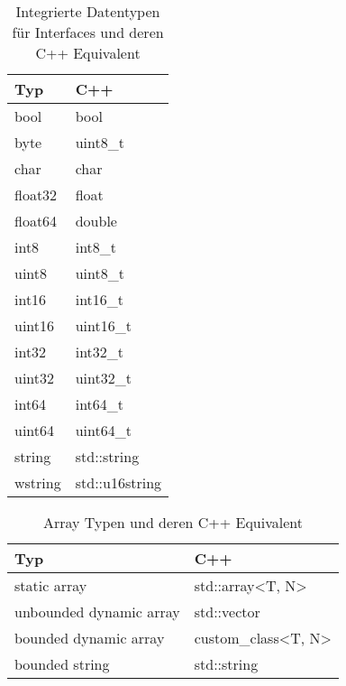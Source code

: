 \begin{table}[ht]
    \centering
    \caption{Integrierte Datentypen für Interfaces und deren C++ Equivalent}
\begin{tabular}{|l|l|}
\hline
\textbf{Typ} & \textbf{C++}   \\ \hline
bool         & bool           \\ \hline
byte         & uint8\_t       \\ \hline
char         & char           \\ \hline
float32      & float          \\ \hline
float64      & double         \\ \hline
int8         & int8\_t        \\ \hline
uint8        & uint8\_t       \\ \hline
int16        & int16\_t       \\ \hline
uint16       & uint16\_t      \\ \hline
int32        & int32\_t       \\ \hline
uint32       & uint32\_t      \\ \hline
int64        & int64\_t       \\ \hline
uint64       & uint64\_t      \\ \hline
string       & std::string    \\ \hline
wstring      & std::u16string \\ \hline
\end{tabular}
    \label{tab:builtintypes}
\end{table}
\begin{table}[ht]
    \centering
    \caption{Array Typen und deren C++ Equivalent}
\begin{tabular}{|l|l|}
\hline
\textbf{Typ} & \textbf{C++}   \\ \hline
static array               & std::array<T, N>   \\ \hline
unbounded dynamic array    & std::vector        \\ \hline
bounded dynamic array      & custom\_class<T, N> \\ \hline
bounded string             & std::string        \\ \hline
\end{tabular}
    \label{tab:arraytypes}
\end{table}

